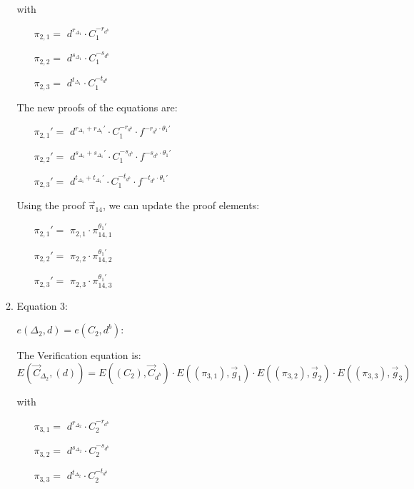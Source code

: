 \begin{description}
\begin{enumerate}
\begin{enumerate}
      with
      \begin{itemize}
      \item[$\pi_{2,1} = $] $d^{r_{\Delta_1}} \cdot C_1^{-r_{d^b}}$
      \item[$\pi_{2,2} = $] $d^{s_{\Delta_1}} \cdot C_1^{-s_{d^b}}$
      \item[$\pi_{2,3} = $] $d^{t_{\Delta_1}} \cdot C_1^{-t_{d^b}}$
      \end{itemize}

      The new proofs of the equations are:
      
      \begin{itemize}
      \item[$\pi_{2,1}' = $] $d^{r_{\Delta_1} + r_{\Delta_1}'} \cdot C_1^{-r_{d^b}} \cdot f^{-r_{d^b} \cdot \theta_1'}$    
      \item[$\pi_{2,2}' = $] $d^{s_{\Delta_1} + s_{\Delta_1}'} \cdot C_1^{-s_{d^b}} \cdot f^{-s_{d^b} \cdot \theta_1'}$    
      \item[$\pi_{2,3}' = $] $d^{t_{\Delta_1} + t_{\Delta_1}'} \cdot C_1^{-t_{d^b}} \cdot f^{-t_{d^b} \cdot \theta_1'}$
      \end{itemize}
      
      Using the proof $\vec{\pi}_{14}$, we can update the proof elements:
      \begin{itemize}
      \item[$\pi_{2,1}' = $] $\pi_{2,1} \cdot \pi_{14,1}^{\theta_1'}$    
      \item[$\pi_{2,2}' = $] $\pi_{2,2} \cdot \pi_{14,2}^{\theta_1'}$    
      \item[$\pi_{2,3}' = $] $\pi_{2,3} \cdot \pi_{14,3}^{\theta_1'}$
      \end{itemize}



    \item Equation 3:
      
      $e(\boxed{\Delta_2},d) = e(C_2, \boxed{d^b})$:
      
      The Verification equation is:  $E(\vec{C}_{\Delta_2}, (d)) = E((C_2), \vec{C}_{d^b}) \cdot E((\pi_{3,1}), \vec{g}_1)\cdot E((\pi_{3,2}), \vec{g}_2)\cdot E((\pi_{3,3}), \vec{g}_3)$
      
      with
      \begin{itemize}
      \item[$\pi_{3,1} = $] $d^{r_{\Delta_2}} \cdot C_2^{-r_{d^b}}$
      \item[$\pi_{3,2} = $] $d^{s_{\Delta_2}} \cdot C_2^{-s_{d^b}}$
      \item[$\pi_{3,3} = $] $d^{t_{\Delta_2}} \cdot C_2^{-t_{d^b}}$
      \end{itemize}
      

\end{enumerate}
\end{enumerate}
\end{description}
